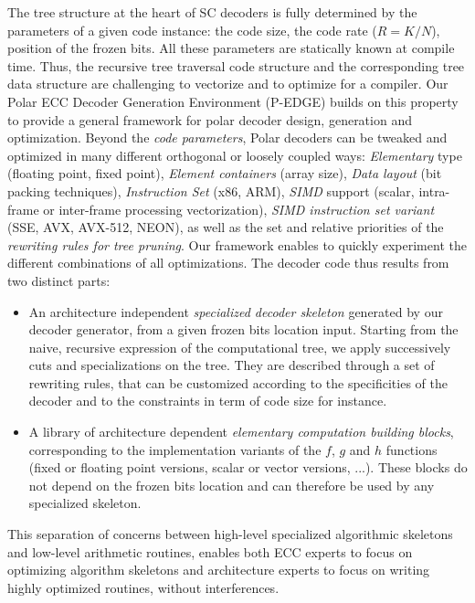 The tree structure at the heart of SC decoders is fully determined by the
parameters of a given code instance: the code size, the code rate ($R = K / N$),
position of the frozen bits. All these parameters are  statically known at
compile time. Thus, the recursive tree traversal code structure and the
corresponding tree data structure are challenging to vectorize and to optimize
for a compiler. Our Polar ECC Decoder Generation Environment (P-EDGE) builds on
this property to provide a general framework for polar decoder design,
generation and optimization. Beyond the \emph{code parameters}, Polar decoders
can be tweaked and optimized in many different orthogonal or loosely coupled
ways: \emph{Elementary} type (floating point, fixed point),
\emph{Element containers} (array size), \emph{Data layout} (bit packing
techniques), \emph{Instruction Set} (x86, ARM), \emph{SIMD} support (scalar,
intra-frame or inter-frame processing vectorization), \emph{SIMD instruction set
variant} (SSE, AVX, AVX-512, NEON), as well as the set and relative priorities
of the \emph{rewriting rules for tree pruning}. Our framework enables to quickly
experiment the different combinations of all optimizations. The decoder code
thus results from two distinct parts:
\begin{itemize}
  \item An architecture independent \emph{specialized decoder skeleton}
    generated by our decoder generator, from a given frozen bits location input.
    Starting from the naive, recursive expression of the computational tree, we
    apply successively cuts and specializations on the tree. They are described
    through a set of rewriting rules, that can be customized according to the
    specificities of the decoder and to the constraints in term of code size for
    instance.
  \item A library of architecture dependent \emph{elementary computation
    building blocks}, corresponding to the implementation variants of the $f$,
    $g$ and $h$ functions (fixed or floating point versions, scalar or vector
    versions, ...). These blocks do not depend on the frozen bits location and
    can therefore be used by any specialized skeleton.
\end{itemize}

This separation of concerns between high-level specialized algorithmic skeletons
and low-level arithmetic routines, enables both ECC experts to focus on
optimizing algorithm skeletons and architecture experts to focus on writing
highly optimized routines, without interferences.

